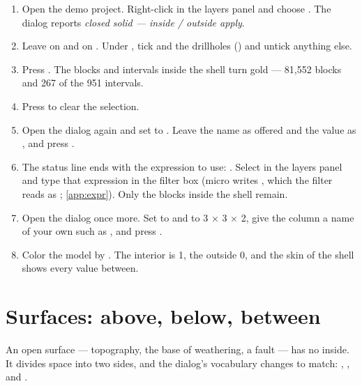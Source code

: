 \begin{tryit}
\begin{enumerate}
\item Open the demo project. Right-click  in the layers panel and choose . The dialog reports \emph{closed solid — inside / outside apply}.
\item Leave  on  and  on . Under , tick  and the drillholes () and untick anything else.
\item Press . The blocks and intervals inside the shell turn gold — 81,552 blocks and 267 of the 951 intervals.
\item Press  to clear the selection.
\item Open the dialog again and set  to . Leave the name as offered and the value as , and press .
\item The status line ends with the expression to use: . Select  in the layers panel and type that expression in the filter box (micro writes \code{==}, which the filter reads as \code{=}; \cref{app:expr}). Only the blocks inside the shell remain.
\item Open the dialog once more. Set  to  and  to 3 × 3 × 2, give the column a name of your own such as , and press .
\item Color the model by . The interior is 1, the outside 0, and the skin of the shell shows every value between.
\end{enumerate}
\end{tryit}


\section{Surfaces: above, below, between}\label{sec:geometry-surfaces}

An open surface — topography, the base of weathering, a fault — has no inside. It divides space into two sides, and the dialog's vocabulary changes to match: , , and .

